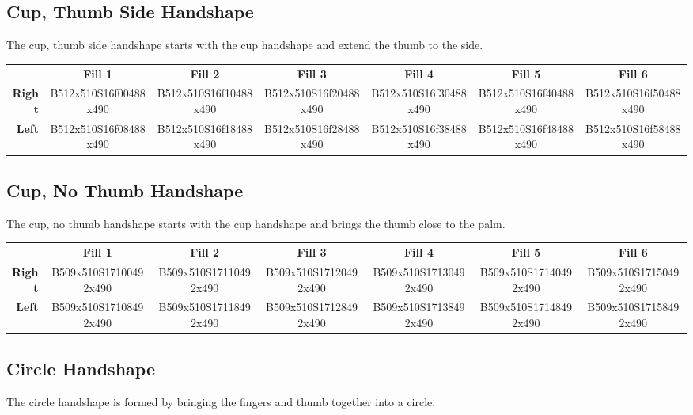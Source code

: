 \documentclass{article}
\begin{document}
\subsection{Cup, Thumb Side Handshape}

The cup, thumb side handshape starts with the cup handshape and extend the thumb to the side.

\begin{center}
\begin{tabular}{r*{6}{c}}
&\textbf{Fill 1}&\textbf{Fill 2}&\textbf{Fill 3}&\textbf{Fill 4}&\textbf{Fill 5}&\textbf{Fill 6}\\
\textbf{Right}&
B512x510S16f00488x490&
B512x510S16f10488x490&
B512x510S16f20488x490&
B512x510S16f30488x490&
B512x510S16f40488x490&
B512x510S16f50488x490\\
\textbf{Left}&
B512x510S16f08488x490&
B512x510S16f18488x490&
B512x510S16f28488x490&
B512x510S16f38488x490&
B512x510S16f48488x490&
B512x510S16f58488x490\\
\end{tabular}
\end{center}

\subsection{Cup, No Thumb Handshape}

The cup, no thumb handshape starts with the cup handshape and brings the thumb close to the palm.

\begin{center}
\begin{tabular}{r*{6}{c}}
&\textbf{Fill 1}&\textbf{Fill 2}&\textbf{Fill 3}&\textbf{Fill 4}&\textbf{Fill 5}&\textbf{Fill 6}\\
\textbf{Right}&
B509x510S17100492x490&
B509x510S17110492x490&
B509x510S17120492x490&
B509x510S17130492x490&
B509x510S17140492x490&
B509x510S17150492x490\\
\textbf{Left}&
B509x510S17108492x490&
B509x510S17118492x490&
B509x510S17128492x490&
B509x510S17138492x490&
B509x510S17148492x490&
B509x510S17158492x490\\
\end{tabular}
\end{center}

\subsection{Circle Handshape}

The circle handshape is formed by bringing the fingers and thumb together into a circle.
\end{document}
